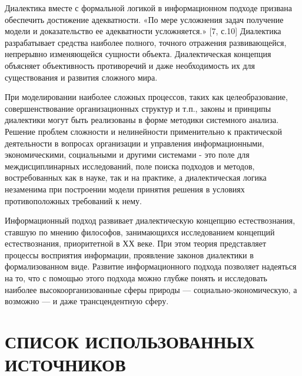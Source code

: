 \documentclass[a4paper,12pt]{report}
\begin{document}
Диалектика вместе с формальной логикой в информационном подходе призвана обеспечить достижение  адекватности. «По мере усложнения задач получение модели и доказательство ее адекватности усложняется.» [7, с.10] Диалектика разрабатывает средства наиболее полного, точного отражения развивающейся, непрерывно изменяющейся сущности объекта. Диалектическая концепция объясняет объективность противоречий и даже необходимость их для существования и развития сложного мира.

При моделировании наиболее сложных процессов, таких как целеобразование, совершенствование организационных структур и т.п., законы и принципы диалектики могут быть реализованы в форме методики системного анализа. 
Решение проблем сложности и нелинейности применительно к практической деятельности в вопросах организации и управления информационными, экономическими, социальными и другими системами - это поле для междисциплинарных исследований, поле поиска подходов и методов, востребованных как в науке, так и на практике, а диалектическая логика незаменима при построении модели принятия решения в условиях противоположных требований к нему.

Информационный подход развивает диалектическую концепцию естествознания, ставшую по мнению философов, занимающихся исследованием концепций естествознания, приоритетной в ХХ веке. При этом теория представляет процессы восприятия информации, проявление законов диалектики в формализованном виде. Развитие информационного подхода позволяет надеяться на то, что с помощью этого подхода можно глубже понять и исследовать наиболее высокоорганизованные сферы природы — социально-экономическую, а возможно — и даже трансцендентную сферу.








	\chapter*{СПИСОК ИСПОЛЬЗОВАННЫХ ИСТОЧНИКОВ} 
\\
\end{document}
